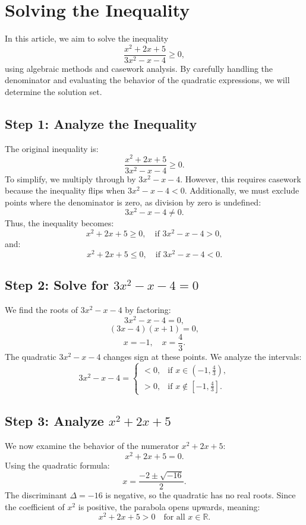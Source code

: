 \documentclass{article}
\begin{document}
\section*{Solving the Inequality}
In this article, we aim to solve the inequality 
\[
\frac{x^2 + 2x + 5}{3x^2 - x - 4} \geq 0,
\]
using algebraic methods and casework analysis. By carefully handling the denominator and evaluating the behavior of the quadratic expressions, we will determine the solution set.

\subsection*{Step 1: Analyze the Inequality}
The original inequality is:
\[
\frac{x^2 + 2x + 5}{3x^2 - x - 4} \geq 0.
\]
To simplify, we multiply through by \( 3x^2 - x - 4 \). However, this requires casework because the inequality flips when \( 3x^2 - x - 4 < 0 \). Additionally, we must exclude points where the denominator is zero, as division by zero is undefined:
\[
3x^2 - x - 4 \neq 0.
\]
Thus, the inequality becomes:
\[
x^2 + 2x + 5 \geq 0, \quad \text{if } 3x^2 - x - 4 > 0,
\]
and:
\[
x^2 + 2x + 5 \leq 0, \quad \text{if } 3x^2 - x - 4 < 0.
\]

\subsection*{Step 2: Solve for \( 3x^2 - x - 4 = 0 \)}
We find the roots of \( 3x^2 - x - 4 \) by factoring:
\[
3x^2 - x - 4 = 0,
\]
\[
(3x - 4)(x + 1) = 0,
\]
\[
x = -1, \quad x = \frac{4}{3}.
\]
The quadratic \( 3x^2 - x - 4 \) changes sign at these points. We analyze the intervals:
\[
3x^2 - x - 4 =
\begin{cases}
< 0, & \text{if } x \in (-1, \frac{4}{3}), \\
> 0, & \text{if } x \notin [-1, \frac{4}{3}].
\end{cases}
\]

\subsection*{Step 3: Analyze \( x^2 + 2x + 5 \)}
We now examine the behavior of the numerator \( x^2 + 2x + 5 \):
\[
x^2 + 2x + 5 = 0.
\]
Using the quadratic formula:
\[
x = \frac{-2 \pm \sqrt{-16}}{2}.
\]
The discriminant \( \Delta = -16 \) is negative, so the quadratic has no real roots. Since the coefficient of \( x^2 \) is positive, the parabola opens upwards, meaning:
\[
x^2 + 2x + 5 > 0 \quad \text{for all } x \in \mathbb{R}.
\]
\end{document}
